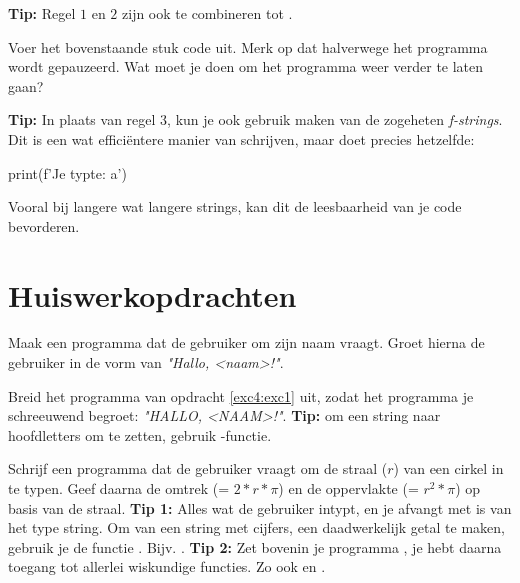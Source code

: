 \begin{remark}
\textbf{Tip:} Regel $1$ en $2$ zijn ook te combineren tot .
\end{remark}

\begin{exercise}
Voer het bovenstaande stuk code uit. Merk op dat halverwege het programma wordt gepauzeerd. Wat moet je doen om het programma weer verder te laten gaan?
\end{exercise}

\begin{remark}
\textbf{Tip:} In plaats van regel $3$, kun je ook gebruik maken van de zogeheten \textit{f-strings}. Dit is een wat efficiëntere manier van schrijven, maar doet precies hetzelfde: 
\begin{python}
print(f'Je typte: {a}')
\end{python}
Vooral bij langere wat langere strings, kan dit de leesbaarheid van je code bevorderen.
\end{remark}

\newpage 

\section{Huiswerkopdrachten}
\begin{exercise} \label{exc4:exc1}
Maak een programma dat de gebruiker om zijn naam vraagt. Groet hierna de gebruiker in de vorm van \textit{"Hallo, <naam>!"}.
\end{exercise}

\begin{exercise}
Breid het programma van opdracht \ref{exc4:exc1} uit, zodat het programma je schreeuwend begroet: \textit{"HALLO, <NAAM>!"}. \newline
\textbf{Tip:} om een string naar hoofdletters om te zetten, gebruik -functie.
\end{exercise}

\begin{exercise}
Schrijf een programma dat de gebruiker vraagt om de straal ($r$) van een cirkel in te typen. Geef daarna de omtrek (= $2*r*\pi$) en de oppervlakte (= $r^2*\pi$) op basis van de straal. \newline \newline
\textbf{Tip 1:} Alles wat de gebruiker intypt, en je afvangt met  is van het type string. Om van een string met cijfers, een daadwerkelijk getal te maken, gebruik je de functie . Bijv. .\newline \newline
\textbf{Tip 2:} Zet bovenin je programma , je hebt daarna toegang tot allerlei wiskundige functies. Zo ook  en .
\end{exercise}

